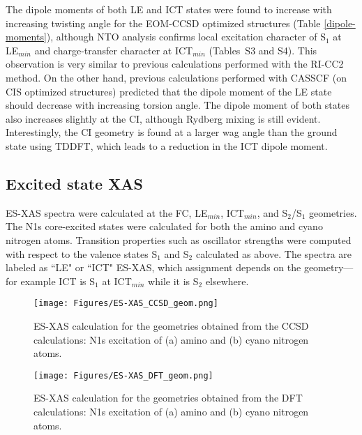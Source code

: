 \documentclass[journal=jacsat,manuscript=article]{achemso}
\begin{document}
The dipole moments of both LE and ICT states were found to increase with increasing twisting angle for the EOM-CCSD optimized structures (Table \ref{dipole-moments}), although NTO analysis confirms local excitation character of S$_1$ at LE$_{min}$ and charge-transfer character at ICT$_{min}$ (Tables~S3 and S4). This observation is very similar to previous calculations performed with the RI-CC2 method.\cite{kohn2004} On the other hand, previous calculations performed with CASSCF (on CIS optimized structures) predicted that the dipole moment of the LE state should decrease with increasing torsion angle.\cite{sobolewski1998ab} The dipole moment of both states also increases slightly at the CI, although Rydberg mixing is still evident. Interestingly, the CI geometry is found at a larger wag angle than the ground state using TDDFT, which leads to a reduction in the ICT dipole moment.

\subsection{Excited state XAS} 

ES-XAS spectra were calculated at the FC, LE$_{min}$, ICT$_{min}$, and S$_2$/S$_1$ geometries. The N1s core-excited states were calculated for both the amino and cyano nitrogen atoms. Transition properties such as oscillator strengths were computed with respect to the valence states S$_1$ and S$_2$ calculated as above. The spectra are labeled as ``LE" or ``ICT" ES-XAS, which assignment depends on the geometry---for example ICT is S$_1$ at ICT$_{min}$ while it is S$_2$ elsewhere.

\begin{figure}
\texttt{[image: Figures/ES-XAS\_CCSD\_geom.png]}\caption{ES-XAS calculation for the geometries obtained from the CCSD calculations: N1s excitation of (a) amino and (b) cyano nitrogen atoms. \label{fig:ES-XAS-CCSD}}
\end{figure}

\begin{figure}
\texttt{[image: Figures/ES-XAS\_DFT\_geom.png]}\caption{ES-XAS calculation for the geometries obtained from the DFT calculations: N1s excitation of (a) amino and (b) cyano nitrogen atoms. \label{fig:ES-XAS-DFT}}
\end{figure}
\end{document}
